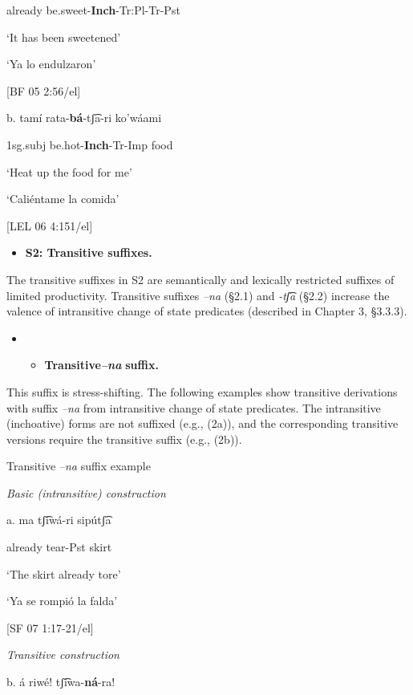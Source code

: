 already    be.sweet-\textbf{Inch}{}-Tr:Pl-Tr-Pst

‘It has been sweetened’

     ‘Ya lo endulzaron’          

    [BF 05 2:56/el]

b.   tamí   rata-\textbf{bá}{}-tʃ͡a-ri    ko’wáami

1sg.subj  be.hot-\textbf{Inch}{}-Tr-Imp  food

‘Heat up the food for me’

‘Caliéntame la comida’        

[LEL 06 4:151/el]


\begin{itemize}
\item \textbf{S2: Transitive suffixes.}
\end{itemize}

The transitive suffixes in S2 are semantically and lexically restricted suffixes of limited productivity. Transitive suffixes \textit{–na} (§2.1) and \textit{{}-tʃ͡a} (§2.2) increase the valence of intransitive change of state predicates (described in Chapter 3, §3.3.3). 

\begin{itemize}
\item \begin{itemize}
\item \textbf{Transitive\textit{–na} }\textbf{suffix.}
\end{itemize}
\end{itemize}

This suffix is stress-shifting. The following examples show transitive derivations with suffix \textit{–na} from intransitive change of state predicates. The intransitive (inchoative) forms are not suffixed (e.g., (2a)), and the corresponding transitive versions require the transitive suffix (e.g., (2b)).


   Transitive \textit{–na} suffix example

    \textit{Basic (intransitive) construction}

a.  ma    tʃ͡iwá-ri    sipútʃ͡a

already    tear-Pst  skirt

‘The skirt already tore’

‘Ya se rompió la falda’        

[SF 07 1:17-21/el]

    \textit{Transitive construction}

b.   á   riwé!    tʃ͡iwa-\textbf{ná}{}-ra!


